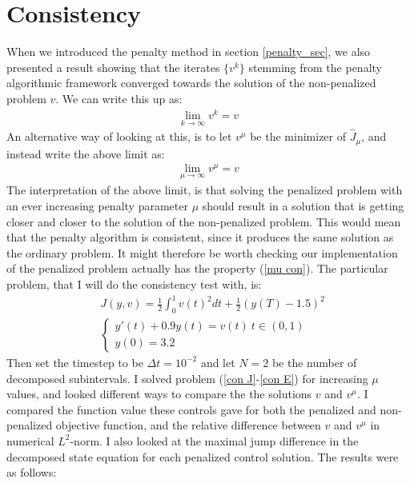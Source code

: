 \section{Consistency}
When we introduced the penalty method in section \ref{penalty_sec}, we also presented a result showing that the iterates $\{v^k\}$ stemming from the penalty algorithmic framework converged towards the solution of the non-penalized problem $v$. We can write this up as:
\begin{align*}
\lim_{k\rightarrow\infty} v^k = v 
\end{align*}  
An alternative way of looking at this, is to let $v^{\mu}$ be the minimizer of $\hat J_{\mu}$, and instead write the above limit as:
\begin{align}
\lim_{\mu\rightarrow\infty} v^{\mu} = v \label{mu con}
\end{align}
The interpretation of the above limit, is that solving the penalized problem with an ever increasing penalty parameter $\mu$ should result in a solution that is getting closer and closer to the solution of the non-penalized problem. This would mean that the penalty algorithm is consistent, since it produces the same solution as the ordinary problem. It might therefore be worth checking our implementation of the penalized problem actually has the property (\ref{mu con}). The particular problem, that I will do the consistency test with, is: 
\begin{align}
&J(y,v) = \frac{1}{2}\int_0^1v(t)^2dt + \frac{1}{2}(y(T)-1.5)^2 \label{con J} \\
&\left\{
     \begin{array}{lr}
       	y'(t)+0.9y(t) = v(t) \ t\in(0,1)\\
       	y(0)=3.2
     \end{array}
   \right. \label{con E}
\end{align}
Then set the timestep to be $\Delta t = 10^{-2}$ and let $N=2$ be the number of decomposed subintervals. I solved problem (\ref{con J}-\ref{con E}) for increasing $\mu$ values, and looked different ways to compare the the solutions $v$ and $v^{\mu}$. I compared the function value these controls gave for both the penalized and non-penalized objective function, and the relative difference between $v$ and $v^{\mu}$ in numerical $L^2$-norm. I also looked at the maximal jump difference in the decomposed state equation for each penalized control solution. The results were as follows:
\\
